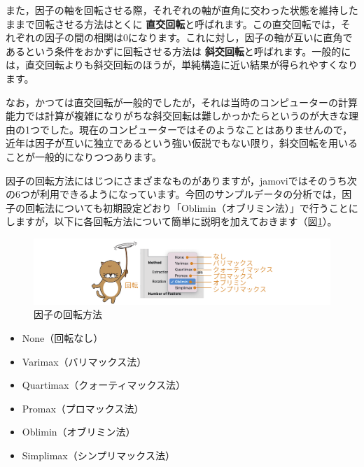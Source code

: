 \documentclass[
  12pt,
  a5jpaper,
  lualatex, ja=standard]{bxjsbook}
\providecommand{\tightlist}{%
  \setlength{\itemsep}{0pt}\setlength{\parskip}{0pt}}
\renewcommand{\emph}[1]{\textbf{\color{emph} #1}}
\newenvironment{jmvsettings}{%
	\begin{center}%
	\begin{tcolorbox}[%
		title=設定項目,
		colframe=gmoji,
		colbacktitle=gmoji,
		colback=gmoji!2!white,
		breakable,
		width=.9\textwidth,
		]\small\addtolength{\leftmargini}{-3\labelsep}%
	}%
	{\end{tcolorbox}\end{center}}
\begin{document}
また，因子の軸を回転させる際，それぞれの軸が直角に交わった状態を維持したままで回転させる方法はとくに\emph{直交回転}と呼ばれます。この直交回転では，それぞれの因子の間の相関は0になります。これに対し，因子の軸が互いに直角であるという条件をおかずに回転させる方法は\emph{斜交回転}と呼ばれます。一般的には，直交回転よりも斜交回転のほうが，単純構造に近い結果が得られやすくなります。

なお，かつては直交回転が一般的でしたが，それは当時のコンピューターの計算能力では計算が複雑になりがちな斜交回転は難しかっかたらというのが大きな理由の1つでした。現在のコンピューターではそのようなことはありませんので，近年は因子が互いに独立であるという強い仮説でもない限り，斜交回転を用いることが一般的になりつつあります。

因子の回転方法にはじつにさまざまなものがありますが，jamoviではそのうち次の6つが利用できるようになっています。今回のサンプルデータの分析では，因子の回転法についても初期設定どおり「Oblimin（オブリミン法）」で行うことにしますが，以下に各回転方法について簡単に説明を加えておきます（図\ref{fig:factor-efa-factor-rotation}）。

\begin{figure}[!ht]

{\centering \includegraphics[width=1\linewidth]{images/factor/efa-factor-rotation} 

}

\caption{因子の回転方法}\label{fig:factor-efa-factor-rotation}
\end{figure}

\begin{jmvsettings}

\begin{itemize}
\tightlist
\item
  None（回転なし）
\item
  Varimax（バリマックス法）
\item
  Quartimax（クォーティマックス法）
\item
  Promax（プロマックス法）
\item
  Oblimin（オブリミン法）
\item
  Simplimax（シンプリマックス法）
\end{itemize}

\end{jmvsettings}
\end{document}
